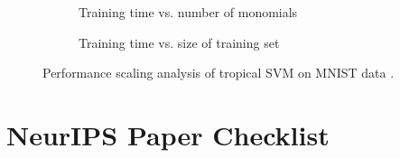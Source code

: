 \documentclass{article}
\begin{document}
\begin{figure}[htbp]
    \centering
    \begin{subfigure}{0.48\textwidth}
        \centering
        \resizebox{0.95\textwidth}{!}{}
        \caption{Training time vs. number of monomials}
        \label{fig:pca_degree_scaling}
    \end{subfigure}
    \hfill
    \begin{subfigure}{0.48\textwidth}
        \centering
        \resizebox{0.95\textwidth}{!}{}
        \caption{Training time vs. size of training set}
        \label{fig:sample_size_scaling}
    \end{subfigure}
    \caption{Performance scaling analysis of tropical SVM on MNIST data \cite{MNIST}.}
    \label{fig:scaling_analysis}
\end{figure}


\newpage
\section*{NeurIPS Paper Checklist}
\end{document}

